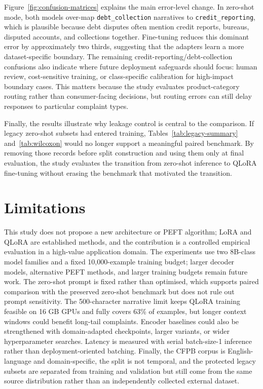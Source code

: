 \documentclass{elektr}
\begin{document}
Figure~\ref{fig:confusion-matrices} explains the main error-level change. In zero-shot mode, both models over-map \texttt{debt\_collection} narratives to \texttt{credit\_reporting}, which is plausible because debt disputes often mention credit reports, bureaus, disputed accounts, and collections together. Fine-tuning reduces this dominant error by approximately two thirds, suggesting that the adapters learn a more dataset-specific boundary. The remaining credit-reporting/debt-collection confusions also indicate where future deployment safeguards should focus: human review, cost-sensitive training, or class-specific calibration for high-impact boundary cases. This matters because the study evaluates product-category routing rather than consumer-facing decisions, but routing errors can still delay responses to particular complaint types.

Finally, the results illustrate why leakage control is central to the comparison. If legacy zero-shot subsets had entered training, Tables~\ref{tab:legacy-summary} and~\ref{tab:wilcoxon} would no longer support a meaningful paired benchmark. By removing those records before split construction and using them only at final evaluation, the study evaluates the transition from zero-shot inference to QLoRA fine-tuning without erasing the benchmark that motivated the transition.

\section{Limitations}

This study does not propose a new architecture or PEFT algorithm; LoRA and QLoRA are established methods, and the contribution is a controlled empirical evaluation in a high-value application domain. The experiments use two 8B-class model families and a fixed 10,000-example training budget; larger decoder models, alternative PEFT methods, and larger training budgets remain future work. The zero-shot prompt is fixed rather than optimised, which supports paired comparison with the preserved zero-shot benchmark but does not rule out prompt sensitivity. The 500-character narrative limit keeps QLoRA training feasible on 16 GB GPUs and fully covers 63\% of examples, but longer context windows could benefit long-tail complaints. Encoder baselines could also be strengthened with domain-adapted checkpoints, larger variants, or wider hyperparameter searches. Latency is measured with serial batch-size-1 inference rather than deployment-oriented batching. Finally, the CFPB corpus is English-language and domain-specific, the split is not temporal, and the protected legacy subsets are separated from training and validation but still come from the same source distribution rather than an independently collected external dataset.
\end{document}
